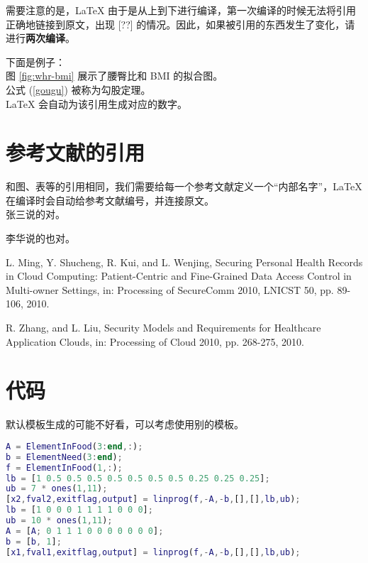 \documentclass{article}
\begin{document}
需要注意的是，LaTeX 由于是从上到下进行编译，第一次编译的时候无法将引用正确地链接到原文，出现 [??] 的情况。因此，如果被引用的东西发生了变化，请进行\textbf{两次编译}。

下面是例子：\\

图 \ref{fig:whr-bmi} 展示了腰臀比和 BMI 的拟合图。\\

公式 (\ref{gougu}) 被称为勾股定理。\\

LaTeX 会自动为该引用生成对应的数字。

\section{参考文献的引用}

和图、表等的引用相同，我们需要给每一个参考文献定义一个“内部名字”，LaTeX 在编译时会自动给参考文献编号，并连接原文。\\

张三说的对。\cite{Zhang3}

李华说的也对。\cite{Li10}

\begin{thebibliography}{}
	
	L. Ming, Y. Shucheng, R. Kui, and L. Wenjing, Securing Personal Health Records in Cloud Computing: Patient-Centric and Fine-Grained
	Data Access Control in Multi-owner Settings, in: Processing of SecureComm 2010, LNICST 50, pp. 89-106, 2010.
	
	R. Zhang, and L. Liu, Security Models and Requirements for Healthcare Application Clouds, in: Processing of  Cloud 2010, pp. 268-275, 2010.
	
\end{thebibliography}

\section{代码}

默认模板生成的可能不好看，可以考虑使用别的模板。

\begin{lstlisting}[language=matlab]
A = ElementInFood(3:end,:);
b = ElementNeed(3:end);
f = ElementInFood(1,:);
lb = [1 0.5 0.5 0.5 0.5 0.5 0.5 0.5 0.25 0.25 0.25];
ub = 7 * ones(1,11);
[x2,fval2,exitflag,output] = linprog(f,-A,-b,[],[],lb,ub);
lb = [1 0 0 0 1 1 1 1 0 0 0];
ub = 10 * ones(1,11);
A = [A; 0 1 1 1 0 0 0 0 0 0 0];
b = [b, 1];
[x1,fval1,exitflag,output] = linprog(f,-A,-b,[],[],lb,ub);
\end{lstlisting}
\end{document}
